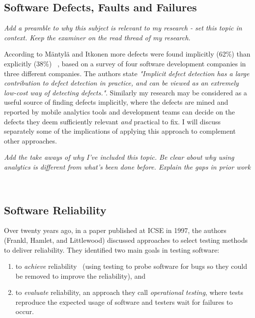 \hypertarget{defects.faults.failures}{}
\subsection{Software Defects, Faults and Failures}
\emph{Add a preamble to why this subject is relevant to my research - set this topic in context. Keep the examiner on the read thread of my research.}


According to Mäntylä and Itkonen more defects were found implicitly (62\%) than explicitly (38\%) ~\cite{mantyla2014_how_are_software_defects_found}, based on a survey of four software development companies in three different companies. The authors state \emph{"Implicit defect detection has a large contribution to defect detection in practice, and can be viewed as
an extremely low-cost way of detecting defects."}. Similarly my research may be considered as a useful source of finding defects implicitly, where the defects are mined and reported by mobile analytics tools and development teams can decide on the defects they deem sufficiently relevant \emph{and} practical to fix. I will discuss separately some of the implications of applying this approach to complement other approaches.

\emph{Add the take aways of why I've included this topic. Be clear about why using analytics is different from what's been done before. Explain the gaps in prior work}

~\hypertarget{software.reliability}{}
\subsection{Software Reliability}
Over twenty years ago, in a paper published at ICSE in 1997, the authors (Frankl, Hamlet, and Littlewood) discussed approaches to select testing methods to deliver reliability. They identified two main goals in testing software: 
\begin{enumerate}
    \item to \emph{achieve} reliability~\cite{frankl1997choosing_testing_for_reliability} (using testing to probe software for bugs so they could be removed to improve the reliability), and 
    \item to \emph{evaluate} reliability, an approach they call \emph{operational testing}, where tests reproduce the expected usage of software and testers wait for failures to occur.
\end{enumerate}

